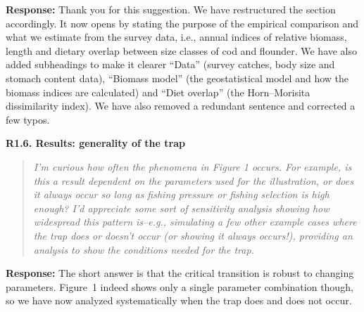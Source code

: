 \documentclass[11pt]{article}
\newenvironment{revcomment}[1]
  {\par\medskip\noindent\textbf{#1}\par\begin{quote}\itshape\color{commentgrey}}
  {\end{quote}}
\newcommand{\response}{\par\noindent\textbf{Response:} }
\begin{document}
\response Thank you for this suggestion. We have restructured the section accordingly. It now opens by stating the purpose of the empirical comparison and what we estimate from the survey data, i.e., annual indices of relative biomass, length and dietary overlap between size classes of cod and flounder. We have also added subheadings to make it clearer ``Data'' (survey catches, body size and stomach content data), ``Biomass model'' (the geostatistical model and how the biomass indices are calculated) and ``Diet overlap'' (the Horn–Morisita dissimilarity index). We have also removed a redundant sentence and corrected a few typos.

\begin{revcomment}{R1.6. Results: generality of the trap}
I'm curious how often the phenomena in Figure 1 occurs. For example, is this a result dependent on the parameters used for the illustration, or does it always occur so long as fishing pressure or fishing selection is high enough? I'd appreciate some sort of sensitivity analysis showing how widespread this pattern is--e.g., simulating a few other example cases where the trap does or doesn't occur (or showing it always occurs!), providing an analysis to show the conditions needed for the trap.
\end{revcomment}

\response The short answer is that the critical transition is robust to changing parameters. Figure~1 indeed shows only a single parameter combination though, so we have now analyzed systematically when the trap does and does not occur.
\end{document}
